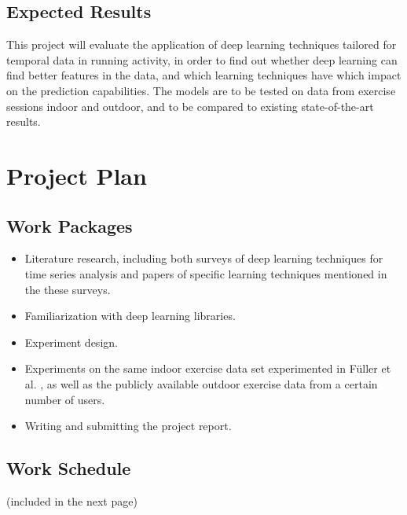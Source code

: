\documentclass[12pt]{article}
\begin{document}
    \subsection{Expected Results}

    This project will evaluate the application of deep learning techniques tailored for temporal data in running activity, in order to find out whether deep learning can find better features in the data, and which learning techniques have which impact on the prediction capabilities. The models are to be tested on data from exercise sessions indoor and outdoor, and to be compared to existing state-of-the-art results.

\section{Project Plan}

    \subsection{Work Packages}
    \begin{itemize}[label={--}]
        \item Literature research, including both surveys of deep learning techniques for time series analysis
            and papers of specific learning techniques mentioned in the these surveys.
        \item Familiarization with deep learning libraries.
        \item Experiment design.
        \item Experiments on the same indoor exercise data set experimented in F{\"u}ller et al. \cite{Fueller15}, as well as the publicly available outdoor exercise data from a certain number of users.
        \item Writing and submitting the project report.
        \end{itemize}

    \subsection{Work Schedule}
    (included in the next page)
    




\end{document}
